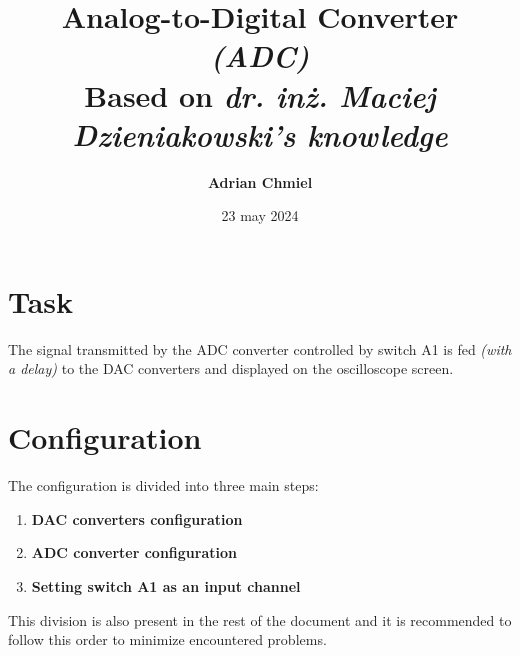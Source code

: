 \documentclass{article}
\begin{document}
\title{\textbf{Analog-to-Digital Converter \textit{(ADC)}}
\\ \large{Based on \textit{dr. inż. Maciej Dzieniakowski's knowledge}}}
\author{\textbf{Adrian Chmiel}}
\date{23 may 2024}
\maketitle

\section{Task}
The signal transmitted by the ADC converter controlled by switch A1 is fed \textit{(with a delay)} to the DAC converters and displayed on the oscilloscope screen.

\section{Configuration}
The configuration is divided into three main steps:
\begin{enumerate}[label=\arabic*.]
    \item \textbf{DAC converters configuration}
    \item \textbf{ADC converter configuration}
    \item \textbf{Setting switch A1 as an input channel}
\end{enumerate}
This division is also present in the rest of the document and it is recommended to follow this order to minimize encountered problems.
\end{document}
